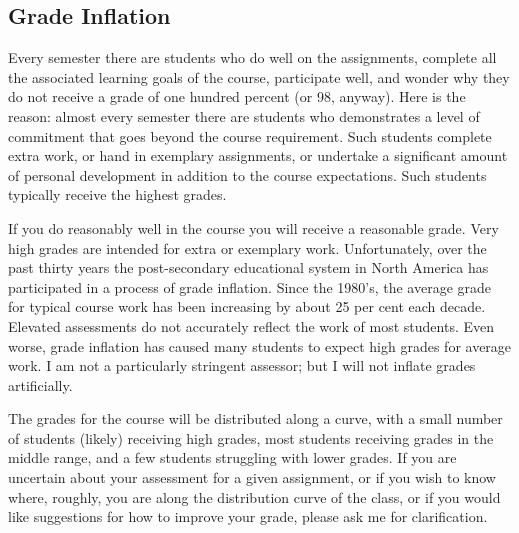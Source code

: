 \documentclass[letterpaper,10pt,headsepline]{scrreprt}
\begin{document}
\subsection{Grade Inflation}
Every semester there are students who do well on the
assignments, complete all the associated learning goals of the course,
participate well, and wonder why they do not receive a grade of one
hundred percent (or 98, anyway). Here is the reason: almost every
semester there are students who demonstrates a level of commitment
that goes beyond the course requirement. Such students complete extra
work, or hand in exemplary assignments, or undertake a significant
amount of personal development in addition to the course expectations.
Such students typically receive the highest grades.

If you do reasonably well in the course you will receive a reasonable
grade. Very high grades are intended for extra or exemplary work.
Unfortunately, over the past thirty years the post-secondary
educational system in North America has participated in a process of
grade inflation. Since the 1980's, the average grade for typical
course work has been increasing by about 25 per cent each decade.
Elevated assessments do not accurately reflect the work of most
students. Even worse, grade inflation has caused many students to
expect high grades for average work. I am not a particularly stringent
assessor; but I will not inflate grades artificially.

The grades for the course will be distributed along a curve, with a
small number of students (likely) receiving high grades, most students
receiving grades in the middle range, and a few students struggling
with lower grades. If you are uncertain about your assessment for a
given assignment, or if you wish to know where, roughly, you are along
the distribution curve of the class, or if you would like suggestions
for how to improve your grade, please ask me for clarification.
\clearpage

\end{document}
